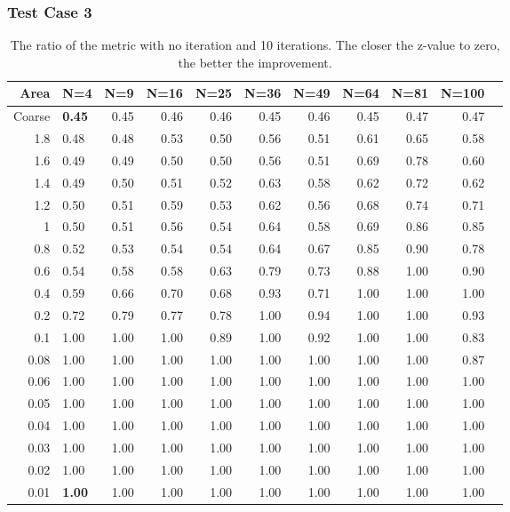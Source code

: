 \documentclass[]{beamer}
\begin{document}
\begin{frame}[t]\frametitle{Test Case 3}
\begin{table}[H]
\centering
\tiny
\caption{The ratio  of the metric with no iteration and 10 iterations. The closer the z-value to zero, the better the improvement.} 
\begin{tabular}{rlrrrrrrrrr}
  \hline
  Area & N=4 & N=9 & N=16 & N=25 & N=36 & N=49 & N=64 & N=81 & N=100 \\ 
  \hline
Coarse & \textbf{\cellcolor{blue!25}0.45} & 0.45 & 0.46 & 0.46 & 0.45 & 0.46 & 0.45 & 0.47 & 0.47 \\ 
  1.8 & 0.48 & 0.48 & 0.53 & 0.50 & 0.56 & 0.51 & 0.61 & 0.65 & 0.58 \\ 
 1.6 & 0.49 & 0.49 & 0.50 & 0.50 & 0.56 & 0.51 & 0.69 & 0.78 & 0.60 \\ 
 1.4 & 0.49 & 0.50 & 0.51 & 0.52 & 0.63 & 0.58 & 0.62 & 0.72 & 0.62 \\ 
 1.2 & 0.50 & 0.51 & 0.59 & 0.53 & 0.62 & 0.56 & 0.68 & 0.74 & 0.71 \\ 
1 & 0.50 & 0.51 & 0.56 & 0.54 & 0.64 & 0.58 & 0.69 & 0.86 & 0.85 \\ 
 0.8 & 0.52 & 0.53 & 0.54 & 0.54 & 0.64 & 0.67 & 0.85 & 0.90 & 0.78 \\ 
 0.6 & 0.54 & 0.58 & 0.58 & 0.63 & 0.79 & 0.73 & 0.88 & 1.00 & 0.90 \\ 
 0.4 & 0.59 & 0.66 & 0.70 & 0.68 & 0.93 & 0.71 & 1.00 & 1.00 & 1.00 \\ 
   0.2 & 0.72 & 0.79 & 0.77 & 0.78 & 1.00 & 0.94 & 1.00 & 1.00 & 0.93 \\ 
 0.1 & 1.00 & 1.00 & 1.00 & 0.89 & 1.00 & 0.92 & 1.00 & 1.00 & 0.83 \\ 
 0.08 & 1.00 & 1.00 & 1.00 & 1.00 & 1.00 & 1.00 & 1.00 & 1.00 & 0.87 \\ 
 0.06 & 1.00 & 1.00 & 1.00 & 1.00 & 1.00 & 1.00 & 1.00 & 1.00 & 1.00 \\ 
 0.05 & 1.00 & 1.00 & 1.00 & 1.00 & 1.00 & 1.00 & 1.00 & 1.00 & 1.00 \\ 
0.04 & 1.00 & 1.00 & 1.00 & 1.00 & 1.00 & 1.00 & 1.00 & 1.00 & 1.00 \\ 
  0.03 & 1.00 & 1.00 & 1.00 & 1.00 & 1.00 & 1.00 & 1.00 & 1.00 & 1.00 \\ 
  0.02 & 1.00 & 1.00 & 1.00 & 1.00 & 1.00 & 1.00 & 1.00 & 1.00 & 1.00 \\ 
  0.01 & \textbf{\cellcolor{blue!25}1.00} & 1.00 & 1.00 & 1.00 & 1.00 & 1.00 & 1.00 & 1.00 & 1.00 \\ 
   \hline
\end{tabular}
\end{table}
\end{frame}
\end{document}
